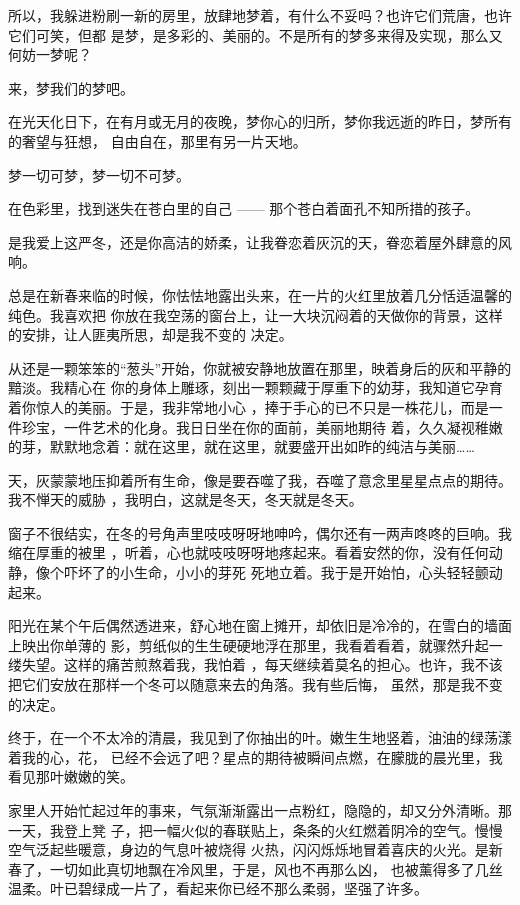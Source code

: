 \documentclass[12pt,a4paper]{article}
\begin{document}
		所以，我躲进粉刷一新的房里，放肆地梦着，有什么不妥吗？也许它们荒唐，也许它们可笑，但都
	是梦，是多彩的、美丽的。不是所有的梦多来得及实现，那么又何妨一梦呢？

		来，梦我们的梦吧。

		在光天化日下，在有月或无月的夜晚，梦你心的归所，梦你我远逝的昨日，梦所有的奢望与狂想，
	自由自在，那里有另一片天地。

		梦一切可梦，梦一切不可梦。

		在色彩里，找到迷失在苍白里的自己 —— 那个苍白着面孔不知所措的孩子。

	\endwriting



		是我爱上这严冬，还是你高洁的娇柔，让我眷恋着灰沉的天，眷恋着屋外肆意的风响。

		总是在新春来临的时候，你怯怯地露出头来，在一片的火红里放着几分恬适温馨的纯色。我喜欢把
	你放在我空荡的窗台上，让一大块沉闷着的天做你的背景，这样的安排，让人匪夷所思，却是我不变的
	决定。

		从还是一颗笨笨的“葱头”开始，你就被安静地放置在那里，映着身后的灰和平静的黯淡。我精心在
	你的身体上雕琢，刻出一颗颗藏于厚重下的幼芽，我知道它孕育着你惊人的美丽。于是，我非常地小心
	，捧于手心的已不只是一株花儿，而是一件珍宝，一件艺术的化身。我日日坐在你的面前，美丽地期待
	着，久久凝视稚嫩的芽，默默地念着：就在这里，就在这里，就要盛开出如昨的纯洁与美丽……

		天，灰蒙蒙地压抑着所有生命，像是要吞噬了我，吞噬了意念里星星点点的期待。我不惮天的威胁
	，我明白，这就是冬天，冬天就是冬天。

		窗子不很结实，在冬的号角声里吱吱呀呀地呻吟，偶尔还有一两声咚咚的巨响。我缩在厚重的被里
	，听着，心也就吱吱呀呀地疼起来。看着安然的你，没有任何动静，像个吓坏了的小生命，小小的芽死
	死地立着。我于是开始怕，心头轻轻颤动起来。

		阳光在某个午后偶然透进来，舒心地在窗上摊开，却依旧是冷冷的，在雪白的墙面上映出你单薄的
	影，剪纸似的生生硬硬地浮在那里，我看着看着，就骤然升起一缕失望。这样的痛苦煎熬着我，我怕着
	，每天继续着莫名的担心。也许，我不该把它们安放在那样一个冬可以随意来去的角落。我有些后悔，
	虽然，那是我不变的决定。

		终于，在一个不太冷的清晨，我见到了你抽出的叶。嫩生生地竖着，油油的绿荡漾着我的心，花，
	已经不会远了吧？星点的期待被瞬间点燃，在朦胧的晨光里，我看见那叶嫩嫩的笑。

		家里人开始忙起过年的事来，气氛渐渐露出一点粉红，隐隐的，却又分外清晰。那一天，我登上凳
	子，把一幅火似的春联贴上，条条的火红燃着阴冷的空气。慢慢空气泛起些暖意，身边的气息叶被烧得
	火热，闪闪烁烁地冒着喜庆的火光。是新春了，一切如此真切地飘在冷风里，于是，风也不再那么凶，
	也被薰得多了几丝温柔。叶已碧绿成一片了，看起来你已经不那么柔弱，坚强了许多。
\end{document}
